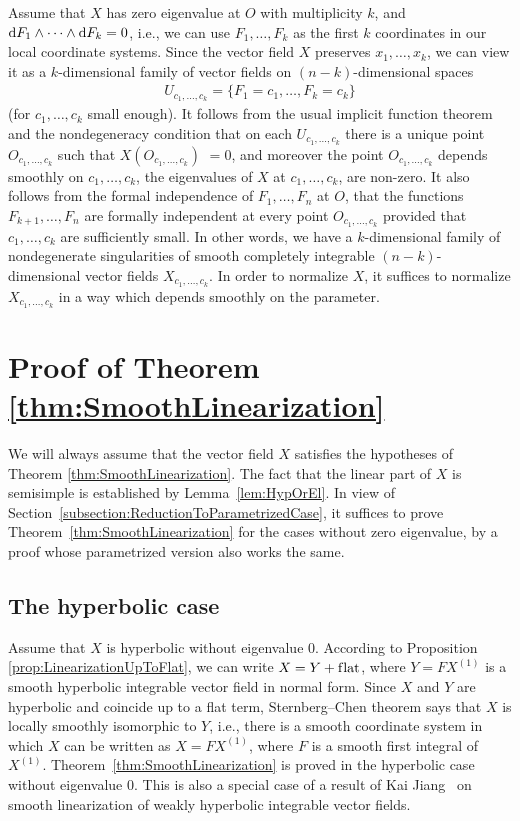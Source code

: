 \documentclass[11pt]{article}
\numberwithin{equation}{section}
\begin{document}
Assume that $X$ has zero eigenvalue at $O$ with multiplicity $k$, and ${\rm d}F_1 \wedge \dots \wedge {\rm d}F_k = 0$,
i.e., we can use $F_1,\dots,F_k$ as the f\/irst $k$ coordinates in our local coordinate systems. Since
the vector f\/ield $X$ preserves $x_1,\dots,x_k$, we can view it as a $k$-dimensional family of vector f\/ields
on $(n-k)$-dimensional spaces
\begin{gather*}
 U_{c_1,\dots,c_k} = \{F_1 = c_1, \dots, F_k = c_k\}
\end{gather*}
(for $c_1,\dots,c_k$ small enough). It follows from the
usual implicit function theorem and the nondegeneracy condition
that on each $U_{c_1,\dots,c_k}$ there is a unique
point $O_{c_1,\dots,c_k}$ such that $X(O_{c_1,\dots,c_k})$ $= 0$, and moreover the point $O_{c_1,\dots,c_k}$
depends smoothly on $c_1,\dots,c_k$, the eigenvalues of $X$ at $c_1,\dots,c_k$, are non-zero.
It also follows from the formal independence of $F_1,\dots,F_n$ at $O$, that the
functions $F_{k+1},\dots,F_n$ are formally independent at every point $O_{c_1,\dots,c_k}$ provided
that $c_1,\dots,c_k$ are suf\/f\/iciently small. In other words, we have a $k$-dimensional family of nondegenerate
singularities of smooth completely integrable $(n-k)$-dimensional vector f\/ields $X_{c_1,\dots,c_k}$.
In order to normalize $X$, it suf\/f\/ices to normalize $X_{c_1,\dots,c_k}$ in a way which depends smoothly
on the parameter.

\section{Proof of Theorem \ref{thm:SmoothLinearization}}\label{section3}

We will always assume that the vector f\/ield
$X$ satisf\/ies the hypotheses of Theorem \ref{thm:SmoothLinearization}.
The fact that the linear part of $X$ is semisimple is established by Lemma~\ref{lem:HypOrEl}.
In view of Section~\ref{subsection:ReductionToParametrizedCase}, it suf\/f\/ices to prove
Theorem~\ref{thm:SmoothLinearization} for the cases without zero eigenvalue, by a proof whose
parametrized version also works the same.

\subsection{The hyperbolic case} Assume that $X$ is hyperbolic without eigenvalue 0.
According to Proposition \ref{prop:LinearizationUpToFlat}, we can write $X = Y + \text{f\/lat}$,
where $Y = FX^{(1)}$ is a smooth hyperbolic integrable vector f\/ield in normal form. Since
$X$ and $Y$ are hyperbolic and coincide up to a f\/lat term, Sternberg--Chen theorem
\cite{Chen-Vector1963, Sternberg} says that $X$ is locally smoothly isomorphic to $Y$, i.e.,
there is a smooth coordinate system in which $X$ can be written as $X = F X^{(1)}$, where $F$
is a smooth f\/irst integral of~$X^{(1)}$. Theorem~\ref{thm:SmoothLinearization} is proved in the
hyperbolic case without eigenvalue 0. This is also a special case
of a result of Kai Jiang~\cite{Jiang-WeakHyp2016} on smooth linearization of
weakly hyperbolic integrable vector f\/ields.
\end{document}
